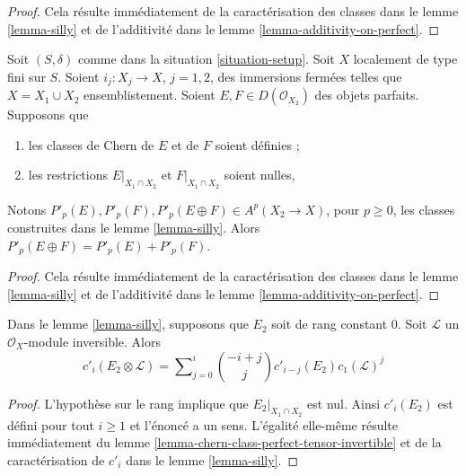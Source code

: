 \begin{proof}
Cela résulte immédiatement de la caractérisation des classes dans le
lemme \ref{lemma-silly} et de l'additivité dans le
lemme \ref{lemma-additivity-on-perfect}.
\end{proof}

\begin{lemma}
\label{lemma-silly-sum-P}
Soit $(S, \delta)$ comme dans la situation \ref{situation-setup}. Soit $X$
localement de type fini sur $S$. Soient $i_j : X_j \to X$, $j = 1, 2$,
des immersions fermées telles que $X = X_1 \cup X_2$ ensemblistement. Soient
$E, F \in D(\mathcal{O}_{X_2})$ des objets parfaits. Supposons que
\begin{enumerate}
\item les classes de Chern de $E$ et de $F$ soient définies ;
\item les restrictions $E|_{X_1 \cap X_2}$ et $F|_{X_1 \cap X_2}$ soient nulles,
\end{enumerate}
Notons $P'_p(E), P'_p(F), P'_p(E \oplus F) \in A^p(X_2 \to X)$, pour $p \geq 0$,
les classes construites dans le lemme \ref{lemma-silly}. Alors
$P'_p(E \oplus F) = P'_p(E) + P'_p(F)$.
\end{lemma}

\begin{proof}
Cela résulte immédiatement de la caractérisation des classes dans le
lemme \ref{lemma-silly} et de l'additivité dans le
lemme \ref{lemma-additivity-on-perfect}.
\end{proof}

\begin{lemma}
\label{lemma-silly-tensor-invertible}
Dans le lemme \ref{lemma-silly}, supposons que $E_2$ soit de rang constant $0$.
Soit $\mathcal{L}$ un $\mathcal{O}_X$-module inversible. Alors
$$
c'_i(E_2 \otimes \mathcal{L}) =
\sum\nolimits_{j = 0}^i
\binom{- i + j}{j} c'_{i - j}(E_2) c_1(\mathcal{L})^j
$$
\end{lemma}

\begin{proof}
L'hypothèse sur le rang implique que $E_2|_{X_1 \cap X_2}$ est nul.
Ainsi $c'_i(E_2)$ est défini pour tout $i \geq 1$ et l'énoncé
a un sens. L'égalité elle-même résulte
immédiatement du lemme \ref{lemma-chern-class-perfect-tensor-invertible}
et de la caractérisation de $c'_i$ dans le lemme \ref{lemma-silly}.
\end{proof}

